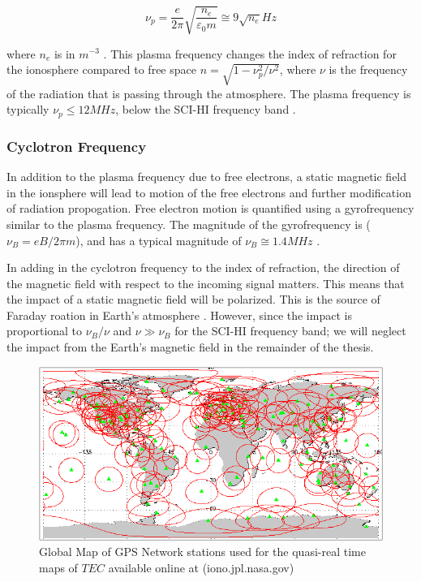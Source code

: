 \begin{equation}
\nu_p = \frac{e}{2 \pi} \sqrt{\frac{n_e}{\varepsilon_0 m}} \cong 9 \sqrt{n_e} Hz
\end{equation}

where $n_e$ is in $m^{-3}$ \cite{thompson_2001}. This plasma frequency changes the index of refraction for the ionosphere compared to free space $n = \sqrt{1-\nu_p^2/\nu^2}$, where $\nu$ is the frequency of the radiation that is passing through the atmosphere. The plasma frequency is typically $\nu_p \leq 12 MHz$, below the SCI-HI frequency band \cite{thompson_2001}. 

\subsubsection{Cyclotron Frequency}
In addition to the plasma frequency due to free electrons, a static magnetic field in the ionsphere will lead to motion of the free electrons and further modification of radiation propogation. Free electron motion is quantified using a gyrofrequency similar to the plasma frequency. The magnitude of the gyrofrequency is ($\nu_B = eB/2 \pi m$), and has a typical magnitude of $\nu_B \cong 1.4 MHz$ \cite{thompson_2001}. 

In adding in the cyclotron frequency to the index of refraction, the direction of the magnetic field with respect to the incoming signal matters. This means that the impact of a static magnetic field will be polarized. This is the source of Faraday roation in Earth's atmosphere \cite{thompson_2001}. However, since the impact is proportional to $\nu_B/\nu$ and $\nu \gg \nu_B$ for the SCI-HI frequency band; we will neglect the impact from the Earth's magnetic field in the remainder of the thesis. 


\begin{figure}[htb]
\begin{center}
\includegraphics[width=0.95\linewidth]{Ionosphere/figures/gps_sitemap.png}
\caption{Global Map of GPS Network stations used for the quasi-real time maps of $TEC$ available online at (iono.jpl.nasa.gov)}
\label{Fig:gps_stat}
\end{center}
\end{figure}

